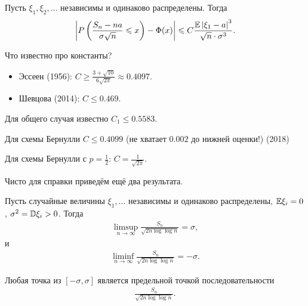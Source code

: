 \documentclass[../main.tex]{subfiles}
\begin{document}
\begin{thm}
 Пусть $ \xi_1, \xi_2, \ldots $ независимы и одинаково распределены.  Тогда
\begin{align*}
\left| P \left( \frac{S_n - na}{\sigma \sqrt n} \leqslant x \right) - \Phi(x) \right| \leqslant C \frac{\mathbb E \left| \xi_1 - a \right|^{3}}{\sqrt n \cdot \sigma^{3}}.
\end{align*}
\end{thm}

Что известно про константы?

\begin{itemize}
 \item Эссеен (1956): $ C \geqslant \frac{3 + \sqrt{10}}{6 \sqrt{2\pi}} \approx 0.4097 $.
 \item Шевцова (2014): $ C \leqslant 0.469 $.
\end{itemize}

Для общего случая известно $ C_1 \leqslant 0.5583 $.

Для схемы Бернулли $ C \leqslant 0.4099 $ (не хватает $ 0.002 $ до нижней оценки!) (2018)

Для схемы Бернулли  с $ p = \frac{1}{2} $: $ C = \frac{1}{\sqrt{2\pi}} $.

Чисто для справки приведём ещё два результата.

\begin{thm}
 Пусть случайные величины $ \xi_1, \ldots $ независимы и одинаково распределены, $ \mathbb E \xi_i = 0 $, $ \sigma^{2} = \mathbb D \xi_i > 0 $. Тогда
 \begin{align*}
  \limsup_{n \to \infty} \frac{S_n}{\sqrt{2n \log\log n}} = \sigma,
 \end{align*} и
 \begin{align*}
  \liminf_{n \to \infty} \frac{S_n}{\sqrt{2n \log\log n}} = -\sigma.
 \end{align*}
\end{thm}

\begin{thm}[Штрассена]
 Любая точка из $ [-\sigma, \sigma] $ является предельной точкой последовательности
  \begin{align*}
   \frac{S_n}{\sqrt{2 n \log \log n}}.
 \end{align*}
\end{thm}
\end{document}
